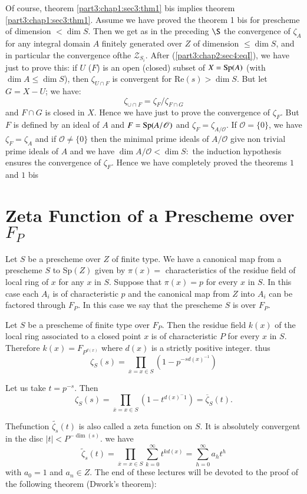 Of course, theorem \ref{part3:chap1:sec3:thm1} bis implies theorem
\ref{part3:chap1:sec3:thm1}. Assume we have proved 
the theorem 1 bis for prescheme of dimension $<\dim S$. Then we get
as in the preceding $\S$ the convergence of $\zeta _A$ for any
integral domain $A$ finitely generated over $Z$ of dimension $\leq
\dim S$, and in particular the convergence of\pageoriginale the
$\mathcal{Z}_{S_i}$. After (\ref{part3:chap2:sec4:eqI}), we have just
to prove this: if 
$U$ (\resp $F$) is an open (\resp closed) subset of $X=\operatorname{Sp} (A)$ (with
$\dim A \leq \dim S$), 
then $\zeta_{U \cap F}$ is convergent for Re$(s)> \dim S$. But let
$G=X-U$; we have: 
$$
\zeta_{\cup \cap F}=\zeta_F/ \zeta _{F \cap G}
$$
and $F\cap G$ is closed in $X$. Hence we have just to prove the
convergence of $\zeta_F$. But $F$ is defined by an ideal of $A$ and
$F=\operatorname{Sp} (A/ \mathscr{O})$ and $\zeta_F=\zeta_{A/\mathscr{O}}$. If
$\mathscr{O}=\{0\}$, we have $\zeta_F=\zeta_A$ and if $\mathscr{O}\neq
\{0\}$ then the minimal prime ideals of $A/\mathscr{O}$ give non
trivial prime ideals of $A$ and we have $\dim A/ \mathscr{O}<\dim S:$
the induction hypothesis ensures the convergence of $\zeta_F$. Hence
we have completely proved the theorems $1$ and $1$ bis 

\section{Zeta Function of a Prescheme over $F_P$}\label{part3:chap2:sec5}

Let $S$ be a prescheme over $Z$ of finite type. We have a canonical
map from a prescheme $S$ to Sp$(Z)$ given by $\pi(x)=$ characteristics
of the residue field of local ring of $x$ for any $x$ in $S$. Suppose
that $\pi(x)=p$ for every $x$ in $S$. In this case each $A_i$ is of
characteristic $p$ and the canonical map from $Z$ into $A_i$ can be
factored through $F_P$. In this case we say that the prescheme $S$ is
over $F_P$. 

Let $S$ be a prescheme of finite type over $F_P$. Then the residue
field $k(x)$ of the local ring associated to a closed point $x$ is of
characteristic $P$ for every $x$ in $S$. Therefore
$k(x)=F_{P^{d(x)}}$ where $d(x)$ is a strictly positive
integer. thus 
$$
\zeta_S(s)=\prod_{\overline{x}=x \in S}\left(1-p^{-sd(x)^{-1}}\right)
$$

Let us take $t=p^{-s}$. Then
$$
\zeta_S(s)=\prod_{\overline{x}=x \in
  S}\left(1-t^{d(x)^-1} \right)=\overline{\zeta}_S(t). 
$$

The\pageoriginale function $\tilde{\zeta_s}(t)$ is also called a zeta function on
$S$. It is absolutely convergent in the disc $|t|<P^{-\dim(s)}$. we
have 
$$
\tilde{\zeta}_s(t)=\prod_{\overline{x}=x \in S} \sum ^{\infty}_{k=0}
t^{kd(x)}=\sum_{h=0}^{\infty}a_h t^h 
$$
with $a_0=1$ and $a_n \in Z$. The end of these lectures will be
devoted to the proof of the following theorem (Dwork's theorem): 

